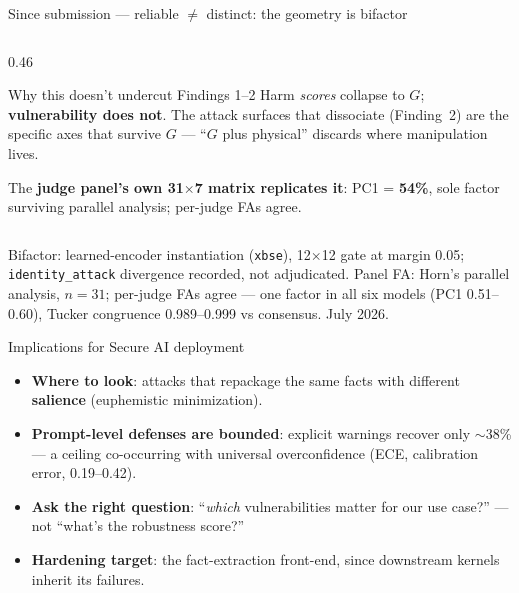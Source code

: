 \documentclass[aspectratio=169,11pt]{beamer}
\newcommand{\hi}[1]{\textcolor{cbblue}{\textbf{#1}}}
\newcommand{\gold}[1]{\textcolor{cborange}{\textbf{#1}}}
\begin{document}
\begin{frame}{Since submission --- reliable $\neq$ distinct: the geometry is bifactor}
\begin{columns}[T]
\begin{column}{0.46\textwidth}
\begin{block}{\small Why this doesn't undercut Findings 1--2}
\small Harm \emph{scores} collapse to $G$; \hi{vulnerability does not}. The attack surfaces that dissociate (Finding~2) are the specific axes that survive $G$ --- ``$G$ plus physical'' discards where manipulation lives.
\end{block}
\smallskip
{\footnotesize The \hi{judge panel's own 31$\times$7 matrix replicates it}: PC1 = \gold{54\%}, sole factor surviving parallel analysis; per-judge FAs agree.}
\end{column}
\end{columns}
\vfill
{\tiny Bifactor: learned-encoder instantiation (\texttt{xbse}), 12$\times$12 gate at margin 0.05; \texttt{identity\_attack} divergence recorded, not adjudicated. Panel FA: Horn's parallel analysis, $n{=}31$; per-judge FAs agree --- one factor in all six models (PC1 0.51--0.60), Tucker congruence 0.989--0.999 vs consensus. July 2026.}
\end{frame}

\begin{frame}{Implications for Secure AI deployment}
\begin{itemize}
  \item \hi{Where to look}: attacks that repackage the same facts with different \gold{salience} (euphemistic minimization).
  \item \hi{Prompt-level defenses are bounded}: explicit warnings recover only $\sim$38\% --- a ceiling co-occurring with universal overconfidence (ECE, calibration error, 0.19--0.42).
  \item \hi{Ask the right question}: ``\emph{which} vulnerabilities matter for our use case?'' --- not ``what's the robustness score?''
  \item \hi{Hardening target}: the fact-extraction front-end, since downstream kernels inherit its failures.
\end{itemize}
\end{frame}
\end{document}
